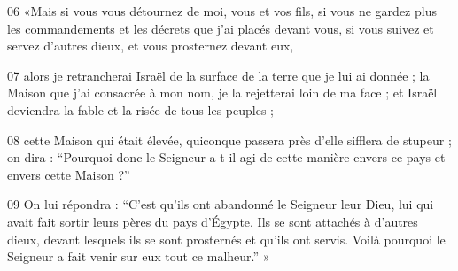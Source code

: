 
06 «Mais si vous vous détournez de moi, vous et vos fils, si vous ne gardez plus les commandements et les décrets que j’ai placés devant vous, si vous suivez et servez d’autres dieux, et vous prosternez devant eux,

07 alors je retrancherai Israël de la surface de la terre que je lui ai donnée ; la Maison que j’ai consacrée à mon nom, je la rejetterai loin de ma face ; et Israël deviendra la fable et la risée de tous les peuples ;

08 cette Maison qui était élevée, quiconque passera près d’elle sifflera de stupeur ; on dira : “Pourquoi donc le Seigneur a-t-il agi de cette manière envers ce pays et envers cette Maison ?”

09 On lui répondra : “C’est qu’ils ont abandonné le Seigneur leur Dieu, lui qui avait fait sortir leurs pères du pays d’Égypte. Ils se sont attachés à d’autres dieux, devant lesquels ils se sont prosternés et qu’ils ont servis. Voilà pourquoi le Seigneur a fait venir sur eux tout ce malheur.” »
